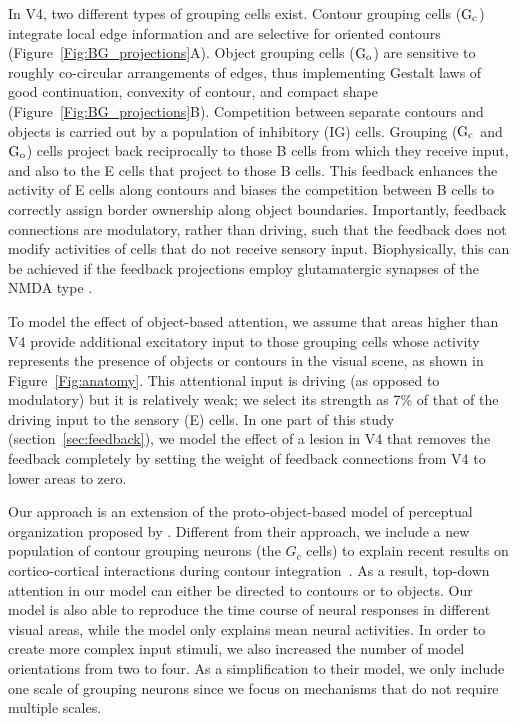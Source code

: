 In V4, two different types of grouping cells exist. Contour grouping
cells ($\rm G_c$) integrate local edge information and are selective
for oriented contours (Figure~\ref{Fig:BG_projections}A). Object grouping cells ($\rm G_o$) are sensitive to roughly co-circular arrangements of edges, thus implementing Gestalt laws of good continuation, convexity of contour, and compact shape (Figure~\ref{Fig:BG_projections}B). Competition between separate contours and objects is carried out by a population of inhibitory (IG)
cells. Grouping ($\rm G_c$ and $\rm G_o$) cells project back reciprocally to those B cells from which they receive input, and also to the E cells that project to those B cells. This feedback enhances the
activity of E cells along contours and biases the competition between
B cells to correctly assign border ownership along object boundaries. Importantly, feedback connections are modulatory, rather than driving, such that the feedback does not modify activities of cells that do not receive sensory input. Biophysically, this can be achieved if the feedback projections employ glutamatergic synapses of the NMDA type \citep{Wagatsuma_etal16a}.

To model the effect of object-based attention, we assume that areas
higher than V4 provide additional excitatory input to those grouping cells whose activity represents the presence of objects or contours in the visual scene,  as shown in Figure~\ref{Fig:anatomy}. This attentional input is driving (as opposed to modulatory) but it is relatively weak; we select its strength as 7\% of that of the driving input to the sensory (E) cells. In one part of this study (section~\ref{sec:feedback}), we model the effect of a lesion in V4 that removes the feedback completely by setting the weight of feedback connections from V4 to lower areas to zero.

Our approach is an extension of the proto-object-based model of perceptual organization proposed by \cite{Mihalas_etal11b}. Different
from their approach, we include a new population of contour grouping
neurons (the $G_c$ cells) to explain recent results on cortico-cortical interactions during contour integration~\citep{Chen_etal14}. As a result, top-down attention in our model can either be directed to 
contours or to objects. Our model is also able to reproduce the time course of neural responses in different visual areas, while the \cite{Mihalas_etal11b} model only explains mean neural activities. In order to create more complex input stimuli, we also increased the number of model orientations from two to four. As a simplification to their model, we only include one scale of grouping neurons since we focus on mechanisms that do not require multiple scales.

